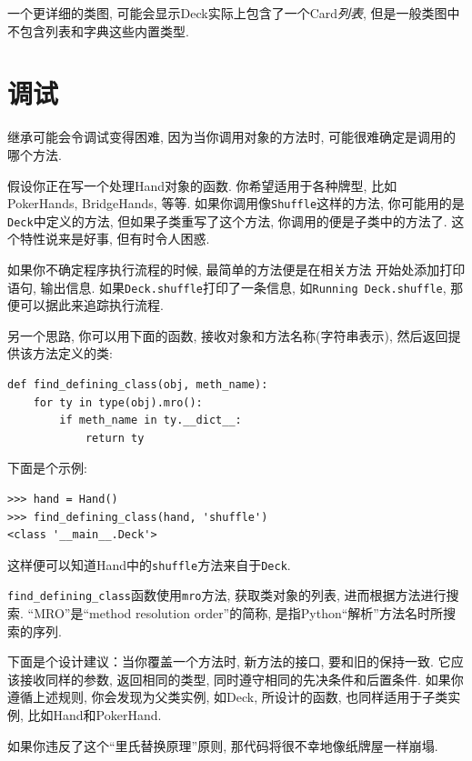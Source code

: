 \documentclass[10pt]{book}
\begin{document}
一个更详细的类图, 可能会显示Deck实际上包含了一个Card{\em 列表}, 
但是一般类图中不包含列表和字典这些内置类型. 

\section{调试}

继承可能会令调试变得困难, 因为当你调用对象的方法时, 
可能很难确定是调用的哪个方法. 

假设你正在写一个处理Hand对象的函数. 
你希望适用于各种牌型, 比如PokerHands, BridgeHands, 等等. 
如果你调用像{\tt Shuffle}这样的方法, 
你可能用的是{\tt Deck}中定义的方法, 
但如果子类重写了这个方法, 
你调用的便是子类中的方法了. 
这个特性说来是好事, 但有时令人困惑. 

如果你不确定程序执行流程的时候, 最简单的方法便是在相关方法
开始处添加打印语句, 输出信息. 
如果{\tt Deck.shuffle}打印了一条信息, 如{\tt Running Deck.shuffle}, 
那便可以据此来追踪执行流程. 

另一个思路, 你可以用下面的函数, 接收对象和方法名称(字符串表示), 
然后返回提供该方法定义的类:

\begin{verbatim}
def find_defining_class(obj, meth_name):
    for ty in type(obj).mro():
        if meth_name in ty.__dict__:
            return ty
\end{verbatim}
%
下面是个示例:

\begin{verbatim}
>>> hand = Hand()
>>> find_defining_class(hand, 'shuffle')
<class '__main__.Deck'>
\end{verbatim}
%
这样便可以知道Hand中的{\tt shuffle}方法来自于{\tt Deck}.

\verb"find_defining_class"函数使用{\tt mro}方法, 获取类对象的列表, 
进而根据方法进行搜索. 
``MRO''是``method resolution order''的简称, 
是指Python``解析''方法名时所搜索的序列.

下面是个设计建议：当你覆盖一个方法时, 
新方法的接口, 要和旧的保持一致. 
它应该接收同样的参数, 返回相同的类型, 
同时遵守相同的先决条件和后置条件. 
如果你遵循上述规则, 你会发现为父类实例, 如Deck, 所设计的函数, 
也同样适用于子类实例, 比如Hand和PokerHand. 


如果你违反了这个``里氏替换原理''原则, 
那代码将很不幸地像纸牌屋一样崩塌. 
\end{document}
